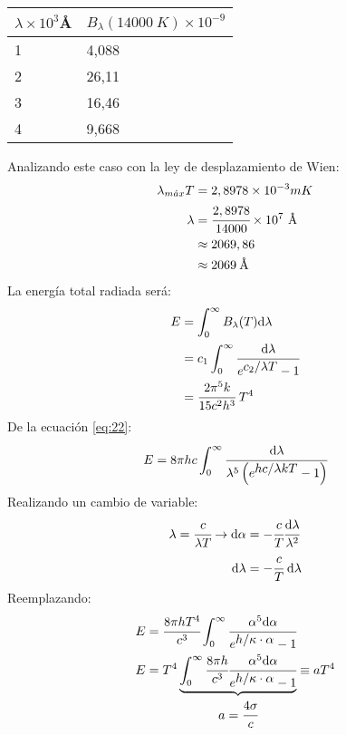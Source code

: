 \documentclass[../main]{subfiles}
\begin{document}
\begin{multicols}{2}
\setlength{\tabcolsep}{0.5em} %
{\renewcommand{\arraystretch}{1.3}
\begin{table}[h]
\centering
\begin{tabular}{l|l}
$\lambda\times 10^3$\AA & $B_\lambda (14000\:K) \times 10^{-9}$ \\ \hline
1         & 4,088                                \\
2         & 26,11                                \\
3         & 16,46                                \\
4         & 9,668                               
\end{tabular}
\end{table}
}
Analizando este caso con la ley de desplazamiento de Wien:
\begin{align}
    \lambda_{m\Acute{a}x}T&=2,8978 \times 10^{-3} mK\\
    \lambda&=\cfrac{2,8978}{14000}\times 10^7\text{ \normalfont\AA}\\
    &\approx 2069,86\\
    &\approx 2069\:\text{\normalfont\AA}
\end{align}
La energía total radiada será:
\begin{align}
    E&=\int_0^\infty B_\lambda(T)\text{d}\lambda\\
    &=c_1 \int_0^\infty \cfrac{\text{d}\lambda}{e^{\displaystyle c_2/\lambda T}-1}\\
    &=\cfrac{2\pi^5 k}{15 c^2 h^3}\;T^4
\end{align}
De la ecuación \ref{eq:22}:
\begin{align}
    E=8\pi hc \int^\infty_0 \cfrac{\text{d}\lambda}{\lambda^5\left(e^{\displaystyle hc/\lambda kT}-1\right)}
\end{align}
Realizando un cambio de variable:
\begin{align}
    \lambda=\cfrac{c}{\lambda T} \rightarrow \text{d}\alpha &= -\cfrac{c}{T}\cfrac{\text{d}\lambda}{\lambda^2}\\
    \text{d}\lambda &= -\cfrac{c}{T}\;\text{d}\lambda
\end{align}
Reemplazando:
\begin{align}
    E&=\cfrac{8\pi h T^4}{c^3}\int^\infty_0\cfrac{\alpha^5\text{d}\alpha}{e^{\displaystyle h/\kappa\cdot\alpha}-1}\\
    E&=T^4\underbrace{\int^\infty_0 \cfrac{8\pi h}{c^3}\cfrac{\alpha^5\text{d}\alpha}{e^{\displaystyle h/\kappa\cdot\alpha}-1}}_{\displaystyle a=\cfrac{4\sigma}{c}}\equiv aT^4 

\end{align}
\end{multicols}
\end{document}
